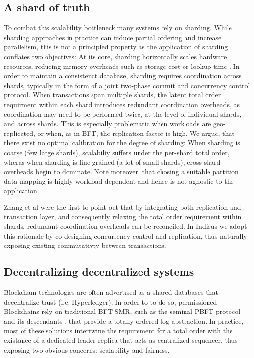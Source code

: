 \subsection{A shard of truth}
To combat this scalability bottleneck many systems rely on sharding. While sharding approaches in practice  can induce partial ordering and increase parallelism, this is not a principled property as the application of sharding conflates two objectives:
At its core, sharding horizontally scales hardware resources, reducing memory overheads such as storage cost or lookup time . In order to maintain a consistenct database, sharding requires coordination across shards, typically in the form of a joint two-phase commit and concurrency control protocol. When transactions span multiple shards, the latent total order requirment within each shard introduces redundant coordination overheads, as coordination may need to be performed twice, at the level of individual shards, and across shards. This is especially problematic when workloads are geo-replicated, or when, as in BFT, the replication factor is high. 
We argue, that there exist no optimal calibration for the degree of sharding: When sharding is coarse (few large shards), scalabiliy suffers under the per-shard total order, wheras when sharding is fine-grained (a lot of small shards), cross-shard overheads begin to dominate. 
Note moreover, that chosing a suitable partition data mapping is highly workload dependent and hence  is not agnostic to the application.

Zhang et al \cite{zhang2016operation, zhang2015tapir} were the first to point out that by integrating both replication and transaction layer, and consequently relaxing the total order requirement within shards, redundant coordination overheads can be reconciled.
In Indicus we adopt this rationale by co-designing concurrency control and replication, thus naturally exposing existing commutativty between transactions.



\subsection{Decentralizing decentralized systems}
Blockchain technologies are often advertised as a shared databases that decentralize trust (i.e. Hyperledger). In order to to do so, permissioned Blockchains rely on traditional BFT SMR, such as the seminal PBFT protocol \cite{castro1999practical} and its descendants \cite{castro1999practical, kotla2007zyzzyva,  gueta2018sbft, clement2009making, buchman2016tendermint, yin2019hotstuff}, that provide a totally ordered log abstraction.
In practice, most of these solutions intertwine the requirement for a total order with the existance of a dedicated leader replica that acts as centralized sequencer, thus exposing two obvious concerns: scalability and fairness.

